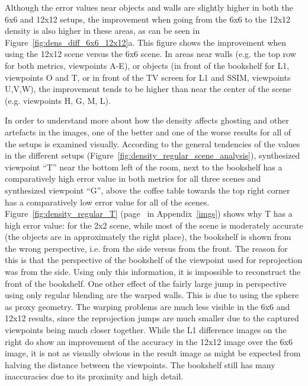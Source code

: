 Although the error values near objects and walls are slightly higher in both the 6x6 and 12x12 setups, the improvement when going from the 6x6 to the 12x12 density is also higher in these areas, as can be seen in Figure~\ref{fig:dens_diff_6x6_12x12}a. This figure shows the improvement when using the 12x12 scene versus the 6x6 scene. In areas near walls (e.g. the top row for both metrics, viewpoints A-E), or objects (in front of the bookshelf for L1, viewpoints O and T, or in front of the TV screen for L1 and SSIM, viewpoints U,V,W), the improvement tends to be higher than near the center of the scene (e.g. viewpoints H, G, M, L).

In order to understand more about how the density affects ghosting and other artefacts in the images, one of the better and one of the worse results for all of the setups is examined visually. According to the general tendencies of the values in the different setups (Figure~\ref{fig:density_regular_scene_analysis}), synthesized viewpoint ``T'' near the bottom left of the room, next to the bookshelf has a comparatively high error value in both metrics for all three scenes and synthesized viewpoint ``G'', above the coffee table towards the top right corner has a comparatively low error value for all of the scenes.
Figure~\ref{fig:density_regular_T} (page~\pageref{fig:density_regular_T} in Appendix~\ref{imgs}) shows why T has a high error value: for the 2x2 scene, while most of the scene is moderately accurate (the objects are in approximately the right place), the bookshelf is shown from the wrong perspective, i.e. from the side versus from the front. The reason for this is that the perspective of the bookshelf of the viewpoint used for reprojection was from the side. Using only this information, it is impossible to reconstruct the front of the bookshelf. One other effect of the fairly large jump in perspective using only regular blending are the warped walls. This is due to using the sphere as proxy geometry. The warping problems are much less visible in the 6x6 and 12x12 results, since the reprojection jumps are much smaller due to the captured viewpoints being much closer together. While the L1 difference images on the right do show an improvement of the accuracy in the 12x12 image over the 6x6 image, it is not as visually obvious in the result image as might be expected from halving the distance between the viewpoints. The bookshelf still has many inaccuracies due to its proximity and high detail.
